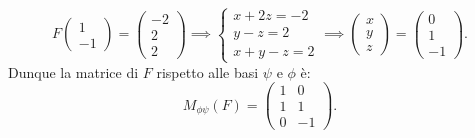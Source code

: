 \documentclass{article}
\theoremstyle{plain}
\theoremstyle{definition}
\theoremstyle{remark}
\begin{document}
\[F\begin{pmatrix}1\\-1\end{pmatrix}=\begin{pmatrix}-2\\2\\2\end{pmatrix}\implies
\begin{cases}
    x+2z=-2\\
    y-z=2\\
    x+y-z=2
\end{cases}\implies \begin{pmatrix}x\\y\\z\end{pmatrix} = \begin{pmatrix}0\\1\\-1\end{pmatrix}
.\]
Dunque la matrice di $F$ rispetto alle basi $\psi$ e $\phi$ è: 
\[
M_{\phi\psi}(F)=\begin{pmatrix}
    1 & 0\\
    1 & 1\\
    0 & -1  
\end{pmatrix}.
\]

\vspace{10pt}
\end{document}
